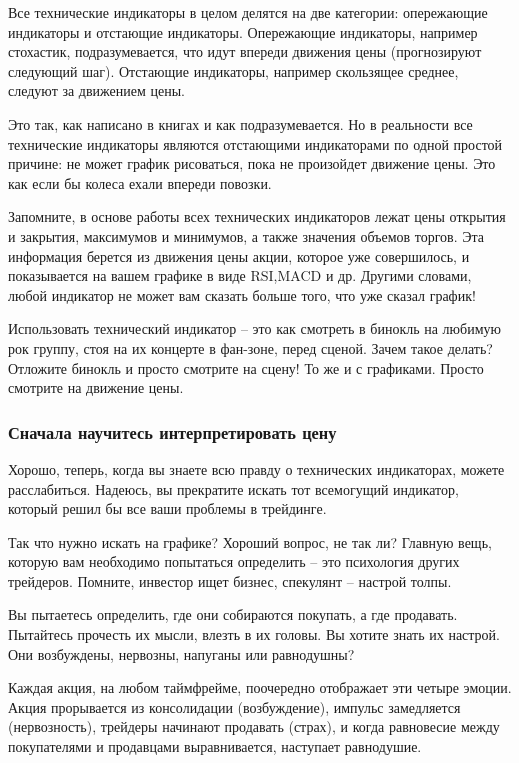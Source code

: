 \documentclass[a5paper]{article}
\begin{document}
Все технические индикаторы в целом делятся на две категории: опережающие индикаторы и отстающие индикаторы. Опережающие индикаторы, например стохастик, подразумевается, что идут впереди движения цены (прогнозируют следующий шаг). Отстающие индикаторы, например скользящее среднее, следуют за движением цены.

Это так, как написано в книгах и как подразумевается. Но в реальности все технические индикаторы являются отстающими индикаторами по одной простой причине: не может график рисоваться, пока не произойдет движение цены. Это как если бы колеса ехали впереди повозки.

Запомните, в основе работы всех технических индикаторов лежат цены открытия и закрытия, максимумов и минимумов, а также значения объемов торгов. Эта информация берется из движения цены акции, которое уже совершилось, и показывается на вашем графике в виде RSI,MACD и др. Другими словами, любой индикатор не может вам сказать больше того, что уже сказал график!

Использовать технический индикатор – это как смотреть в бинокль на
любимую рок группу, стоя на их концерте в фан-зоне, перед
сценой. Зачем такое делать? Отложите бинокль и просто смотрите на
сцену! То же и с графиками. Просто смотрите на движение цены.

\subsubsection{Сначала научитесь интерпретировать цену}

Хорошо, теперь, когда вы знаете всю правду о технических индикаторах, можете расслабиться. Надеюсь, вы прекратите искать тот всемогущий индикатор, который решил бы все ваши проблемы в трейдинге.

Так что нужно искать на графике? Хороший вопрос, не так ли? Главную вещь, которую вам необходимо попытаться определить – это психология других трейдеров. Помните, инвестор ищет бизнес, спекулянт – настрой толпы.

Вы пытаетесь определить, где они собираются покупать, а где продавать. Пытайтесь прочесть их мысли, влезть в их головы. Вы хотите знать их настрой. Они возбуждены, нервозны, напуганы или равнодушны?

Каждая акция, на любом таймфрейме, поочередно отображает эти четыре эмоции. Акция прорывается из консолидации (возбуждение), импульс замедляется (нервозность), трейдеры начинают продавать (страх), и когда равновесие между покупателями и продавцами выравнивается, наступает равнодушие.
\end{document}
